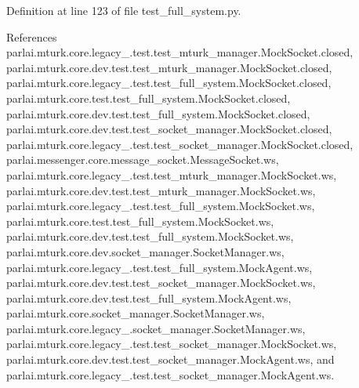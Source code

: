Definition at line 123 of file test\+\_\+full\+\_\+system.\+py.



References parlai.\+mturk.\+core.\+legacy\+\_.\+test.\+test\+\_\+mturk\+\_\+manager.\+Mock\+Socket.\+closed, parlai.\+mturk.\+core.\+dev.\+test.\+test\+\_\+mturk\+\_\+manager.\+Mock\+Socket.\+closed, parlai.\+mturk.\+core.\+legacy\+\_.\+test.\+test\+\_\+full\+\_\+system.\+Mock\+Socket.\+closed, parlai.\+mturk.\+core.\+test.\+test\+\_\+full\+\_\+system.\+Mock\+Socket.\+closed, parlai.\+mturk.\+core.\+dev.\+test.\+test\+\_\+full\+\_\+system.\+Mock\+Socket.\+closed, parlai.\+mturk.\+core.\+dev.\+test.\+test\+\_\+socket\+\_\+manager.\+Mock\+Socket.\+closed, parlai.\+mturk.\+core.\+legacy\+\_.\+test.\+test\+\_\+socket\+\_\+manager.\+Mock\+Socket.\+closed, parlai.\+messenger.\+core.\+message\+\_\+socket.\+Message\+Socket.\+ws, parlai.\+mturk.\+core.\+legacy\+\_.\+test.\+test\+\_\+mturk\+\_\+manager.\+Mock\+Socket.\+ws, parlai.\+mturk.\+core.\+dev.\+test.\+test\+\_\+mturk\+\_\+manager.\+Mock\+Socket.\+ws, parlai.\+mturk.\+core.\+legacy\+\_.\+test.\+test\+\_\+full\+\_\+system.\+Mock\+Socket.\+ws, parlai.\+mturk.\+core.\+test.\+test\+\_\+full\+\_\+system.\+Mock\+Socket.\+ws, parlai.\+mturk.\+core.\+dev.\+test.\+test\+\_\+full\+\_\+system.\+Mock\+Socket.\+ws, parlai.\+mturk.\+core.\+dev.\+socket\+\_\+manager.\+Socket\+Manager.\+ws, parlai.\+mturk.\+core.\+legacy\+\_.\+test.\+test\+\_\+full\+\_\+system.\+Mock\+Agent.\+ws, parlai.\+mturk.\+core.\+dev.\+test.\+test\+\_\+socket\+\_\+manager.\+Mock\+Socket.\+ws, parlai.\+mturk.\+core.\+dev.\+test.\+test\+\_\+full\+\_\+system.\+Mock\+Agent.\+ws, parlai.\+mturk.\+core.\+socket\+\_\+manager.\+Socket\+Manager.\+ws, parlai.\+mturk.\+core.\+legacy\+\_.\+socket\+\_\+manager.\+Socket\+Manager.\+ws, parlai.\+mturk.\+core.\+legacy\+\_.\+test.\+test\+\_\+socket\+\_\+manager.\+Mock\+Socket.\+ws, parlai.\+mturk.\+core.\+dev.\+test.\+test\+\_\+socket\+\_\+manager.\+Mock\+Agent.\+ws, and parlai.\+mturk.\+core.\+legacy\+\_.\+test.\+test\+\_\+socket\+\_\+manager.\+Mock\+Agent.\+ws.

\mbox{\label{classparlai_1_1mturk_1_1core_1_1test_1_1test__full__system_1_1MockSocket_a029402a28285fd5fa2003d7058423a42}} 
